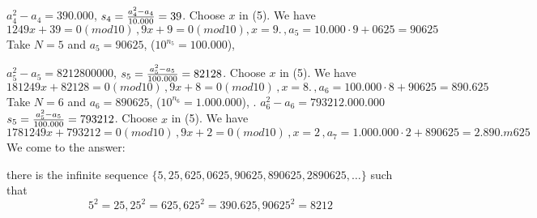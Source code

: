  $a_4^2-a_4=390.000$, $s_4={a_4^2-a_4\over 10.000}=39$. Choose $x$ in (5).  We have
                                   $$
1249x+39=0(mod10)\,,9x+9=0(mod10),x=9.\,,
a_5=10.000\cdot 9+0625=90625
                                   $$
  Take $N=5$ and $a_5=90625$, ($10^{n_5}=100 .000$),

 $a_5^2-a_5=8212800000$, $s_5={a_5^2-a_5\over 100.000}=82128$. Choose $x$ in (5).  We have
                                   $$
181249x+82128=0(mod10)\,,9x+8=0(mod10)\,,x=8.\,,
a_6=100.000\cdot 8+90625=890.625
                                   $$
  Take $N=6$ and $a_6=890625$, ($10^{n_6}=1.000.000$),
.
 $a_6^2-a_6=793212.000.000$ 
 $s_5={a_5^2-a_5\over 100.000}=793212$. Choose $x$ in (5).  We have
                                   $$
1781249x+793212=0(mod10)\,,9x+2=0(mod10)\,,x=2\,,
a_7=1.000 .000\cdot 2+890625=2.890.m625
                                   $$
We come to the answer:

there is the infinite sequence  $\{5,25,625,0625,90625,890625,2890625,\dots \}$
such that
 $$
 5^2=25, 25^2=625, 625^2=390.625, 90625^2=8212
 $$
 \bye
